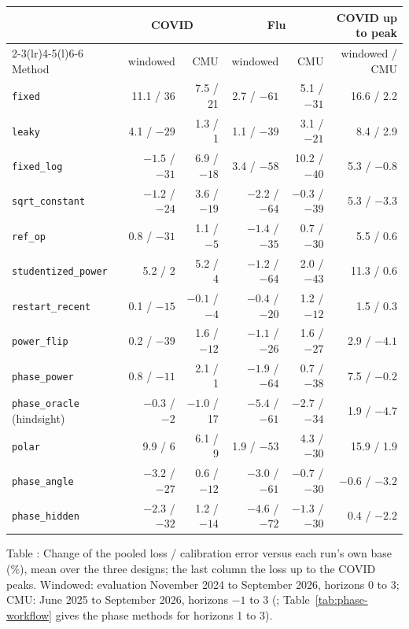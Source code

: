 \documentclass[11pt,a4paper]{article}
\theoremstyle{definition}
\theoremstyle{remark}
\begin{document}
\begin{center}\small
\setlength{\tabcolsep}{4pt}
\renewcommand{\arraystretch}{1.12}
\begin{tabular}{@{}lrrrrr@{}}
\toprule
 & \multicolumn{2}{c}{COVID} & \multicolumn{2}{c}{Flu} & COVID up to peak\\
\cmidrule(lr){2-3}\cmidrule(lr){4-5}\cmidrule(l){6-6}
Method & windowed & CMU & windowed & CMU & windowed / CMU\\
\midrule
\texttt{fixed}             & 11.1 / 36  & 7.5 / 21  & 2.7 / $-61$  & 5.1 / $-31$  & 16.6 / 2.2\\
\texttt{leaky}             & 4.1 / $-29$ & 1.3 / 1   & 1.1 / $-39$  & 3.1 / $-21$  & 8.4 / 2.9\\
\texttt{fixed\_log}        & $-1.5$ / $-31$ & 6.9 / $-18$ & 3.4 / $-58$ & 10.2 / $-40$ & 5.3 / $-0.8$\\
\texttt{sqrt\_constant}    & $-1.2$ / $-24$ & 3.6 / $-19$ & $-2.2$ / $-64$ & $-0.3$ / $-39$ & 5.3 / $-3.3$\\
\texttt{ref\_op}           & 0.8 / $-31$ & 1.1 / $-5$ & $-1.4$ / $-35$ & 0.7 / $-30$ & 5.5 / 0.6\\
\texttt{studentized\_power}& 5.2 / 2   & 5.2 / 4   & $-1.2$ / $-64$ & 2.0 / $-43$ & 11.3 / 0.6\\
\texttt{restart\_recent}   & 0.1 / $-15$ & $-0.1$ / $-4$ & $-0.4$ / $-20$ & 1.2 / $-12$ & 1.5 / 0.3\\
\texttt{power\_flip}       & 0.2 / $-39$ & 1.6 / $-12$ & $-1.1$ / $-26$ & 1.6 / $-27$ & 2.9 / $-4.1$\\
\texttt{phase\_power}      & 0.8 / $-11$ & 2.1 / 1   & $-1.9$ / $-64$ & 0.7 / $-38$ & 7.5 / $-0.2$\\
\texttt{phase\_oracle} (hindsight) & $-0.3$ / $-2$ & $-1.0$ / 17 & $-5.4$ / $-61$ & $-2.7$ / $-34$ & 1.9 / $-4.7$\\
\texttt{polar}             & 9.9 / 6   & 6.1 / 9   & 1.9 / $-53$  & 4.3 / $-30$  & 15.9 / 1.9\\
\addlinespace
\texttt{phase\_angle}      & $-3.2$ / $-27$ & 0.6 / $-12$ & $-3.0$ / $-61$ & $-0.7$ / $-30$ & $-0.6$ / $-3.2$\\
\texttt{phase\_hidden}     & $-2.3$ / $-32$ & 1.2 / $-14$ & $-4.6$ / $-72$ & $-1.3$ / $-30$ & 0.4 / $-2.2$\\
\bottomrule
\end{tabular}
\end{center}
\label{tab:longer-history-methods}
\begin{center}\small Table \thetable: Change of the pooled loss / calibration
error versus each run's own base (\%), mean over the three designs; the
last column the loss up to the COVID peaks. Windowed: evaluation November
2024 to September 2026, horizons $0$ to $3$; CMU: June 2025 to September
2026, horizons $-1$ to $3$ (;
Table~\ref{tab:phase-workflow} gives the phase methods for horizons 1 to 3).
\end{center}
\end{document}

